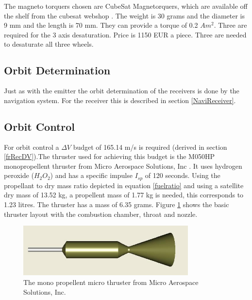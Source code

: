 The magneto torquers chosen are CubeSat Magnetorquers, which are available off the shelf from the cubesat webshop \cite{cubesatshop}. The weight is 30 grams and the diameter is 9 mm and the length is 70 mm. They can provide a torque of 0.2 $Am^2$. Three are required for the 3 axis desaturation. Price is 1150 EUR a piece. Three are needed to desaturate all three wheels.

\subsection{Orbit Determination}
\label{ss:recDDods}
Just as with the emitter the orbit determination of the receivers is done by the navigation system. For the receiver this is described in section \ref{NaviReceiver}.

\subsection{Orbit Control}
\label{ss:recDDocs}
For orbit control a $\Delta V$ budget of 165.14 m/s is required (derived in section \ref{frRecDV}).The thruster used for achieving this budget is the M050HP monopropellent thruster from Micro Aerospace Solutions, Inc \cite{h2o2thruster}. It uses hydrogen peroxide ($H_2O_2$) and has a specific impulse $I_{sp}$ of 120 seconds. Using the propellant to dry mass ratio depicted in equation \ref{fuelratio} and using a satellite dry mass of  13.52 kg, a propellent mass of  1.77 kg is needed, this corresponds to 1.23 litres. The thruster has a mass of 6.35 grams. Figure \ref{fig:microthrust} shows the basic thruster layout with the combustion chamber, throat and nozzle.

\begin{figure} [h]
\centering
\includegraphics[width=0.8\textwidth]{chapters/img/MAS_acsThruster.jpg}
\caption[Micro thruster]{The mono propellent micro thruster from Micro Aerospace Solutions, Inc. \cite{h2o2thruster}}
\label{fig:microthrust}
\end{figure}

